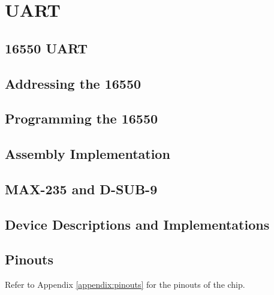 \section{UART}

    \subsection{16550 UART}

    \subsection{Addressing the 16550}

    \subsection{Programming the 16550}

    \subsection{Assembly Implementation}

    \subsection{MAX-235 and D-SUB-9}

    \subsection{Device Descriptions and Implementations}

    \subsection{Pinouts}
    Refer to Appendix \ref{appendix:pinouts} for the pinouts of the chip.
